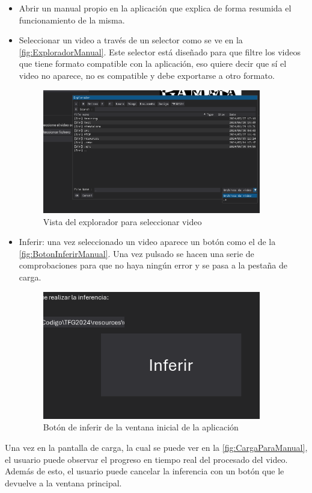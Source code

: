 \begin{itemize}
    \item Abrir un manual propio en la aplicación que explica de forma resumida el funcionamiento de la misma.
    \item Seleccionar un video a través de un selector como se ve en la \autoref{fig:ExploradorManual}. Este selector está diseñado para que filtre los videos que tiene formato compatible con la aplicación, eso quiere decir 
    que sí el video no aparece, no es compatible y debe exportarse a otro formato.
    \begin{figure}[H]
        \centering
        \includegraphics[width=0.9\textwidth]{images/9/Explorador.png}
        \caption{Vista del explorador para seleccionar video}
        \label{fig:ExploradorManual}
    \end{figure}
    \item Inferir: una vez seleccionado un video aparece un botón como el de la \autoref{fig:BotonInferirManual}. Una vez pulsado se hacen una serie de comprobaciones para que no haya ningún error y se pasa a la pestaña de carga.
    \begin{figure}[H]
        \centering
        \includegraphics[width=0.9\textwidth]{images/9/InferirBoton.png}
        \caption{Botón de inferir de la ventana inicial de la aplicación}
        \label{fig:BotonInferirManual}
    \end{figure}
\end{itemize}
\clearpage
Una vez en la pantalla de carga, la cual se puede ver en la \autoref{fig:CargaParaManual}, el usuario puede observar el progreso en tiempo real del procesado del video. Además de esto, el usuario puede cancelar la inferencia con un 
botón que le devuelve a la ventana principal.

